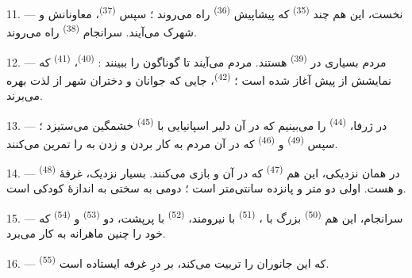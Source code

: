 11. --- نخست، این هم چند  \textsuperscript{(35)} که
پیشاپیش  \textsuperscript{(36)} راه می‌روند ؛ سپس
 \textsuperscript{(37)}، معاونانش و 
شهرک می‌آیند. سرانجام  \textsuperscript{(38)} راه
می‌روند.

\VUsaut{5.0mm}
\VUsaut{3.6mm}

12. --- مردم بسیاری در 
\textsuperscript{(39)} هستند. مردم می‌آیند تا 
گوناگون را ببینند :  \textsuperscript{(40)}،
 \textsuperscript{(41)} که نمایشش از پیش آغاز شده است ؛
 \textsuperscript{(42)}، جایی که جوانان و دختران شهر
از لذت  بهره می‌برند.

13. --- در ژرفا،  \textsuperscript{(44)} را
می‌بینیم که در آن  دلیر اسپانیایی با 
\textsuperscript{(45)} خشمگین می‌ستیزد ؛ سپس 
\textsuperscript{(49)} و  \textsuperscript{(46)}
که در آن مردم به کار بردن  و زدن به  را
تمرین می‌کنند.

14. --- در همان نزدیکی، این هم 
\textsuperscript{(47)} که در آن  و  بازی
می‌کنند. بسیار نزدیک، غرفهٔ  \textsuperscript{(48)} و
 هست.  اولی دو متر و پانزده سانتی‌متر
است ؛ دومی به سختی به اندازهٔ کودکی است.

15. --- سرانجام، این هم  \textsuperscript{(50)}
بزرگ با ،  \textsuperscript{(51)}
با  نیرومند،  \textsuperscript{(52)} با
 پرپشت، دو  \textsuperscript{(53)} و
 \textsuperscript{(54)} که  خود را چنین
ماهرانه به کار می‌برد.

16. ---  \textsuperscript{(55)} که این جانوران را
تربیت می‌کند، بر درِ غرفه ایستاده است.

\VUsaut{6.0mm}
\VUfilet{22mm}
